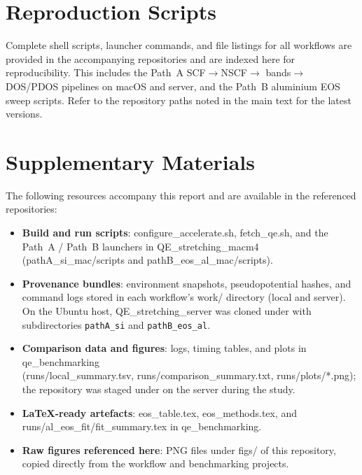 \documentclass[12pt]{article}
\begin{document}
\newpage

\appendix

\section{Reproduction Scripts}
\label{app:repro}
Complete shell scripts, launcher commands, and file listings for all workflows are provided in the accompanying repositories and are indexed here for reproducibility. This includes the Path~A SCF$\rightarrow$NSCF$\rightarrow$ \newline bands$\rightarrow$DOS/PDOS pipelines on macOS and server, and the Path~B aluminium EOS sweep scripts. Refer to the repository paths noted in the main text for the latest versions.

\section{Supplementary Materials}
\label{app:code}
The following resources accompany this report and are available in the referenced repositories:
\begin{sloppypar}
\begin{itemize}[leftmargin=*]
  \setlength\itemsep{4pt}
  \item \textbf{Build and run scripts}: configure\_accelerate.sh, fetch\_qe.sh, and the Path~A / Path~B launchers in QE\_stretching\_macm4\\(pathA\_si\_mac/scripts and pathB\_eos\_al\_mac/scripts).
  \item \textbf{Provenance bundles}: environment snapshots, pseudopotential hashes, and command logs stored in each workflow's work/ directory (local and server). On the Ubuntu host, QE\_stretching\_server was cloned under  with subdirectories \texttt{pathA\_si} and \texttt{pathB\_eos\_al}.
  \item \textbf{Comparison data and figures}: logs, timing tables, and plots in qe\_benchmarking\\(runs/local\_summary.tsv, runs/comparison\_summary.txt, runs/plots/*.png); the repository was staged under  on the server during the study.
  \item \textbf{LaTeX-ready artefacts}: eos\_table.tex, eos\_methods.tex, and runs/al\_eos\_fit/fit\_summary.tex in qe\_benchmarking.
  \item \textbf{Raw figures referenced here}: PNG files under figs/ of this repository, copied directly from the workflow and benchmarking projects.
\end{itemize}
\end{sloppypar}
\end{document}
